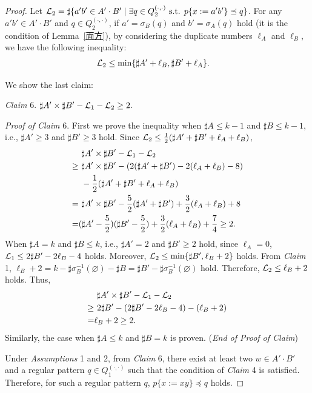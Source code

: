 \begin{proof}
\noindent
Let ${\cal L}_{2} = \sharp\{a'b' \in A'\cdot B' \mid \exists q \in Q_{2}^{(\cdot,\cdot)} \mbox{ s.t. } p\{x:=a'b'\} \preceq q\}$.
For any $a'b' \in A'\cdot B'$ and $q \in Q_{2}^{(\cdot,\cdot)}$, if $a' = \sigma_{B}(q)$ and $b' = \sigma_{A}(q)$ hold (it is the condition of Lemma~\ref{両方}), by considering the duplicate numbers $\ell_{A}$ and $\ell_{B}$, we have the following inequality:
\begin{align*}
  {\cal L}_{2} &\leq \min\{\sharp A' + \ell_{B}, \sharp B' + \ell_{A}\}.
\end{align*}

We show the last claim:
  
\smallskip

\noindent
\textit{Claim} 6. 
$\sharp A' \times \sharp B' - {\cal L}_{1} - {\cal L}_{2} \geq 2$.

\smallskip

\noindent
\textit{Proof of Claim} 6. 
First we prove the inequality when $\sharp A \leq k - 1$ and $\sharp B \leq k - 1$, i.e., $\sharp A' \geq 3$ and $\sharp B' \geq 3$ hold.
Since ${\cal L}_{2} \leq \frac{1}{2}(\sharp A' + \sharp B' + \ell_{A} + \ell_{B})$,
\begin{align*}
  &\ \sharp A' \times \sharp B' - {\cal L}_{1} - {\cal L}_{2}\\
\geq &\ \sharp A' \times \sharp B' - (2(\sharp A' + \sharp B') - 2(\ell_{A} + \ell_{B}) - 8)\\
  &\ - \frac{1}{2}(\sharp A' + \sharp B' + \ell_{A} + \ell_{B})\\
=    &\ \sharp A' \times \sharp B' - \frac{5}{2}(\sharp A' + \sharp B') + \frac{3}{2}(\ell_{A} + \ell_{B}) + 8\\
=    &(\sharp A' - \frac{5}{2})(\sharp B' - \frac{5}{2}) + \frac{3}{2}(\ell_{A} + \ell_{B}) + \frac{7}{4} \geq 2.
\end{align*}
When $\sharp A = k$ and $\sharp B \leq k$, i.e., $\sharp A' = 2$ and $\sharp B' \geq 2$ hold, since $\ell_{A} = 0$,
${\cal L}_{1} \leq 2\sharp B' - 2\ell_{B} -4$ holds.
Moreover, ${\cal L}_{2} \leq \min\{\sharp B', \ell_{B} + 2\}$ holds.
From \textit{Claim} 1, $\ell_B + 2 = k - \sharp\sigma^{-1}_{B}(\varnothing) - \sharp B = \sharp B' - \sharp\sigma^{-1}_{B}(\varnothing)$ hold. Therefore, ${\cal L}_{2} \leq \ell_{B} + 2$ holds.
Thus,
\begin{align*}
  &\ \sharp A' \times \sharp B' - {\cal L}_{1} - {\cal L}_{2}\\
\geq &\ 2\sharp B' - (2\sharp B' - 2\ell_{B} -4) - (\ell_{B} + 2)\\
= & \ell_B + 2 \geq 2.
\end{align*}
Similarly, the case when $\sharp A \leq k$ and $\sharp B = k$ is proven.
(\textit{End of Proof of Claim})

\smallskip

Under \textit{Assumptions} 1 and 2, from \textit{Claim} 6, there exist at least two $w\in A'\cdot B'$ and a regular pattern $q \in Q_{1}^{(\cdot,\cdot)}$ such that the condition of \textit{Claim} 4 is satisfied. 
Therefore, for such a regular pattern $q$, $p \{x := xy\} \preceq q$ holds.
\end{proof}

